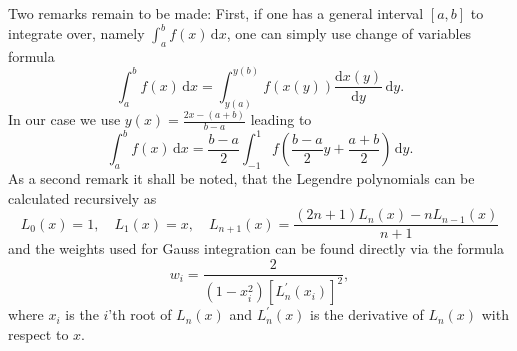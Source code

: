 \documentclass[a4paper,11pt]{article}
\numberwithin{equation}{section}
\begin{document}
{Two remarks remain to be made: First, if one has a general interval $[a,b]$ to integrate over, namely $\int_{a}^{b}f(x)\,\mathrm{d}x$, one can simply use change of variables formula \begin{equation}
 \int_{a}^{b}f(x)\,\mathrm{d}x = \int_{y(a)}^{y(b)}f(x(y))\frac{\mathrm{d}x(y)}{\mathrm{d}y}\,\mathrm{d}y.
\end{equation} In our case we use $y(x) = \frac{2x-(a+b)}{b-a}$ leading to \begin{equation}
\int_{a}^{b}f(x)\,\mathrm{d}x = \frac{b-a}{2}\int_{-1}^{1}f\left(\frac{b-a}{2}y+ \frac{a+b}{2}\right)\,\mathrm{d}y.
\end{equation} As a second remark it shall be noted, that the Legendre polynomials can be calculated recursively as \begin{equation}
L_0(x) = 1, \quad L_1(x) = x, \quad L_{n+1}(x) = \frac{(2n+1)L_n(x) - nL_{n-1}(x)}{n+1}
\end{equation} and the weights used for Gauss integration can be found directly via the formula \begin{equation}
w_i = \frac{2}{(1-x_i^2)\left[L_n^\prime(x_i)\right]^2},
\end{equation} where $x_i$ is the $i$'th root of $L_n(x)$ and $L_n^\prime(x)$ is the derivative of $L_n(x)$ with respect to $x$.
}
\end{document}
